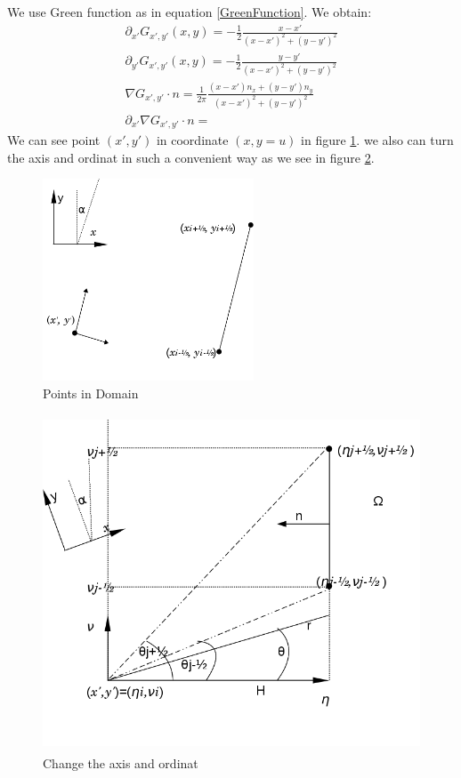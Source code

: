 \documentclass[a4paper,12pt]{article}
\begin{document}
We use Green function as in equation \ref{GreenFunction}. We obtain:
\begin{align}
 \partial_{x'} G_{x',y'}(x,y)=-\frac{1}{2}\frac{x-x'}{(x-x')^2+(y-y')^2}\\
\partial_{y'} G_{x',y'}(x,y)=-\frac{1}{2}\frac{y-y'}{(x-x')^2+(y-y')^2} \\
\nabla G_{x',y'} \cdot n= \frac{1}{2\pi} \frac{(x-x')n_x+(y-y')n_y}{(x-x')^2+(y-y')^2}\\
\partial_{x'}\nabla G_{x',y'} \cdot n=


\end{align}
We can see point $(x',y')$ in coordinate $(x,y=u)$ in figure \ref{PointsDomain}. we also can turn the axis and ordinat in such a convenient way as we see in figure \ref{turnAxis}. 
\begin{figure}[!htbp]
\begin{center}
\includegraphics[height = 6cm]{positionOfPoints1.png}
\end{center}
 \caption{Points in Domain}\label{PointsDomain}
\end{figure}
\begin{figure}[!htbp]
\begin{center}
\includegraphics[height = 10cm]{changeAxis.png}
\end{center}
 \caption{Change the axis and ordinat}\label{turnAxis}
\end{figure}
\end{document}
